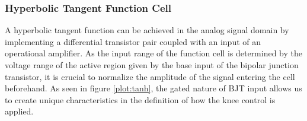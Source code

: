 \documentclass[10pt]{article}
\begin{document}
\begin{multicols*}{2}
                \subsubsection{Hyperbolic Tangent Function Cell}

                    A hyperbolic tangent function can be achieved in the analog signal domain by implementing a differential transistor pair coupled with an input of an operational amplifier.
                    As the input range of the function cell is determined by the voltage range of the active region given by the base input of the bipolar junction transistor, it is crucial to normalize the amplitude of the signal entering the cell beforehand. As seen in figure \ref{plot:tanh}, the gated nature of BJT input allows us to create unique characteristics in the definition of how the knee control is applied.

                        \noindent
                        \begin{minipage}{\linewidth}

                            \centering
\end{minipage}
\end{multicols*}
\end{document}
